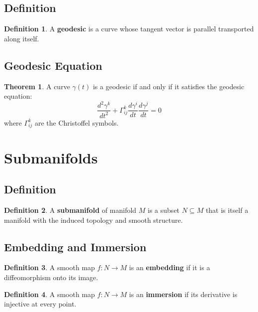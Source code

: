 \documentclass[11pt]{article}
\theoremstyle{definition}
\newtheorem{definition}{Definition}[section]
\newtheorem{theorem}{Theorem}[section]
\begin{document}
\subsection{Definition}
\begin{definition}
A \textbf{geodesic} is a curve whose tangent vector is parallel transported along itself.
\end{definition}

\subsection{Geodesic Equation}
\begin{theorem}
A curve $\gamma(t)$ is a geodesic if and only if it satisfies the geodesic equation:
$$\frac{d^2 \gamma^k}{dt^2} + \Gamma_{ij}^k \frac{d\gamma^i}{dt} \frac{d\gamma^j}{dt} = 0$$
where $\Gamma_{ij}^k$ are the Christoffel symbols.
\end{theorem}

\section{Submanifolds}

\subsection{Definition}
\begin{definition}
A \textbf{submanifold} of manifold $M$ is a subset $N \subseteq M$ that is itself a manifold with the induced topology and smooth structure.
\end{definition}

\subsection{Embedding and Immersion}
\begin{definition}
A smooth map $f: N \to M$ is an \textbf{embedding} if it is a diffeomorphism onto its image.
\end{definition}

\begin{definition}
A smooth map $f: N \to M$ is an \textbf{immersion} if its derivative is injective at every point.
\end{definition}
\end{document}
